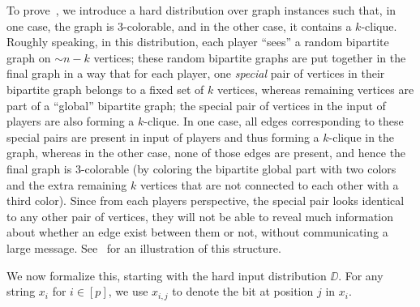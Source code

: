 \documentclass[11pt]{article}
\theoremstyle{definition}
\begin{document}
To prove~, we introduce a hard distribution over graph instances such that, in one case, the graph is $3$-colorable, and in the other case, it contains a $k$-clique. Roughly speaking, in this distribution, each player ``sees'' a random bipartite graph on $\sim n-k$ vertices; these random bipartite graphs are put together in the final graph in a way that 
for each player, one \emph{special} pair of vertices in their bipartite graph belongs to a fixed set of $k$ vertices, whereas remaining vertices are part of a ``global'' bipartite graph; the special pair of vertices in the input of 
players are also forming a $k$-clique. In one case, all edges corresponding to these special pairs are present in input of players and thus forming a $k$-clique in the graph, whereas in the other case, 
none of those edges are present, and hence the final graph is $3$-colorable (by coloring the bipartite global part with two colors and the extra remaining $k$ vertices that are not connected to each other with a third color). 
Since from each players perspective, the special pair looks identical to any other pair of vertices, they will not be able to reveal much information about whether an edge exist between them or not, without communicating a large message. See~ for an illustration of this structure.


We now formalize this, starting with the hard input distribution $\DD$. For any string $x_i $ for $i \in [p]$, we use $x_{i,j}$ to denote the bit at position $j$ in $x_i$. 
\end{document}
